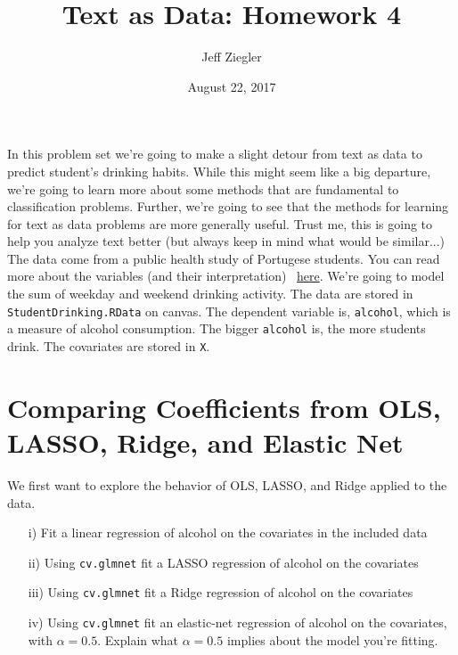 \documentclass[12pt,letterpaper]{article}
\title{Text as Data: Homework 4}
\date{August 22, 2017}
\author{Jeff Ziegler}
\begin{document}
\maketitle


\noindent In this problem set we're going to make a slight detour from text as data to predict student's drinking habits.  While this might seem like a big departure, we're going to learn more about some methods that are fundamental to classification problems.  Further, we're going to see that the methods for learning for text as data problems are more generally useful.  Trust me, this is going to help you analyze text better (but always keep in mind what would be similar...)  The data come from a public health study of Portugese students.  You can read more about the variables (and their interpretation) ~\href{http://archive.ics.uci.edu/ml/datasets/STUDENT+ALCOHOL+CONSUMPTION}{here}. We're going to model the sum of weekday and weekend drinking activity. The data are stored in {\tt StudentDrinking.RData} on canvas.  The dependent variable is, {\tt alcohol}, which is a measure of alcohol consumption.  The bigger {\tt alcohol} is, the more students drink.  The covariates are stored in {\tt X}.

\section{Comparing Coefficients from OLS, LASSO, Ridge, and Elastic Net}

We first want to explore the behavior of OLS, LASSO, and Ridge applied to the data.

\begin{itemize}
\item[i)] Fit a linear regression of alcohol on the covariates in the included data
\item[ii)] Using {\tt cv.glmnet} fit a LASSO regression of alcohol on the covariates
\item[iii)] Using {\tt cv.glmnet} fit a Ridge regression of alcohol on the covariates
\item[iv)] Using {\tt cv.glmnet} fit an elastic-net regression of alcohol on the covariates, with $\alpha = 0.5$.  Explain what $\alpha = 0.5$ implies about the model you're fitting.
\end{itemize}

  
\end{document}
